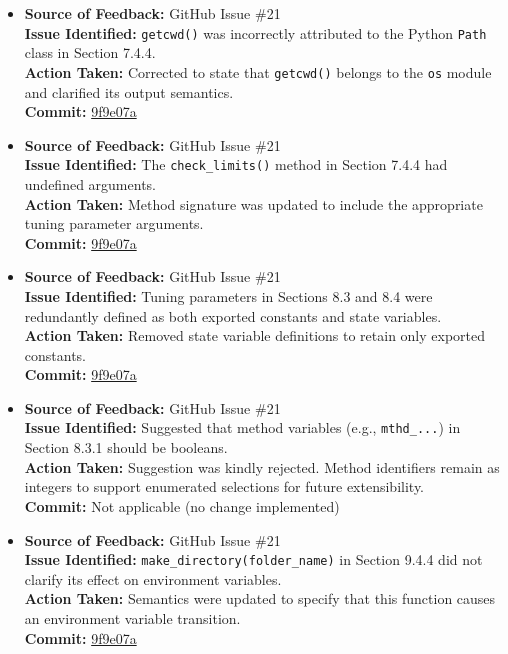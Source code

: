 \documentclass{article}
\begin{document}
\begin{itemize}
  \item \textbf{Source of Feedback:} GitHub Issue \#21 \\
  \textbf{Issue Identified:} \texttt{getcwd()} was incorrectly attributed to the Python \texttt{Path} class in Section 7.4.4. \\
  \textbf{Action Taken:} Corrected to state that \texttt{getcwd()} belongs to the \texttt{os} module and clarified its output semantics. \\
  \textbf{Commit:} \href{https://github.com/KiranSingh15/CAS-741-Image-Correspondences/commit/9f9e07a572e2f0db97f3e057f998ba9bad0d9189}{9f9e07a}

  \item \textbf{Source of Feedback:} GitHub Issue \#21 \\
  \textbf{Issue Identified:} The \texttt{check\_limits()} method in Section 7.4.4 had undefined arguments. \\
  \textbf{Action Taken:} Method signature was updated to include the appropriate tuning parameter arguments. \\
  \textbf{Commit:} \href{https://github.com/KiranSingh15/CAS-741-Image-Correspondences/commit/9f9e07a572e2f0db97f3e057f998ba9bad0d9189}{9f9e07a}

  \item \textbf{Source of Feedback:} GitHub Issue \#21 \\
  \textbf{Issue Identified:} Tuning parameters in Sections 8.3 and 8.4 were redundantly defined as both exported constants and state variables. \\
  \textbf{Action Taken:} Removed state variable definitions to retain only exported constants. \\
  \textbf{Commit:} \href{https://github.com/KiranSingh15/CAS-741-Image-Correspondences/commit/9f9e07a572e2f0db97f3e057f998ba9bad0d9189}{9f9e07a}

  \item \textbf{Source of Feedback:} GitHub Issue \#21 \\
  \textbf{Issue Identified:} Suggested that method variables (e.g., \texttt{mthd\_...}) in Section 8.3.1 should be booleans. \\
  \textbf{Action Taken:} Suggestion was kindly rejected. Method identifiers remain as integers to support enumerated selections for future extensibility. \\
  \textbf{Commit:} Not applicable (no change implemented)

  \item \textbf{Source of Feedback:} GitHub Issue \#21 \\
  \textbf{Issue Identified:} \texttt{make\_directory(folder\_name)} in Section 9.4.4 did not clarify its effect on environment variables. \\
  \textbf{Action Taken:} Semantics were updated to specify that this function causes an environment variable transition. \\
  \textbf{Commit:} \href{https://github.com/KiranSingh15/CAS-741-Image-Correspondences/commit/9f9e07a572e2f0db97f3e057f998ba9bad0d9189}{9f9e07a}

\end{itemize}
\end{document}
